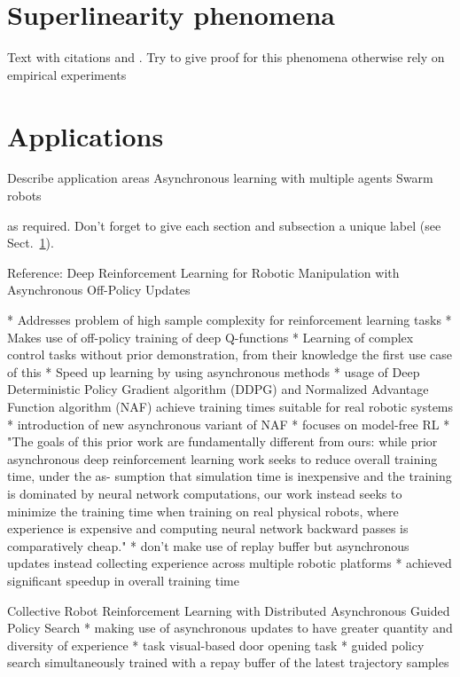     
    \section{Superlinearity phenomena}
    \label{sec:1}
    Text with citations \cite{RefB} and \cite{RefJ}.
    Try to give proof for this phenomena otherwise rely on empirical experiments
     
    \section{Applications}
    \label{sec:2}
    Describe application areas
    Asynchronous learning with multiple agents
    Swarm robots
    
    as required. Don't forget to give each section
    and subsection a unique label (see Sect.~\ref{sec:1}).
    
    Reference: Deep Reinforcement Learning for Robotic Manipulation with
    Asynchronous Off-Policy Updates
    
    * Addresses problem of high sample complexity for reinforcement learning tasks
    * Makes use of off-policy training of deep Q-functions
    * Learning of complex control tasks without prior demonstration, from their knowledge the first use case of this
    * Speed up learning by using asynchronous methods
    * usage of Deep Deterministic Policy Gradient algorithm (DDPG) and Normalized Advantage Function algorithm (NAF) achieve training times suitable for real robotic systems
    * introduction of new asynchronous variant of NAF
    * focuses on model-free	RL
    * "The
    goals of this prior work are fundamentally different from
    ours: while prior asynchronous deep reinforcement learning
    work seeks to reduce overall training time, under the as-
    sumption that simulation time is inexpensive and the training
    is dominated by neural network computations, our work
    instead seeks to minimize the training time when training
    on real physical robots, where experience is expensive and
    computing neural network backward passes is comparatively
    cheap."
    * don't make use of replay buffer but asynchronous updates instead collecting experience across multiple robotic platforms
    * achieved significant speedup in overall training time
    
    
    Collective Robot Reinforcement Learning with Distributed
    Asynchronous Guided Policy Search
    * making use of asynchronous updates to have greater quantity and diversity of experience
    * task visual-based door opening task
    * guided policy search simultaneously trained with a repay buffer of the latest trajectory samples
    
